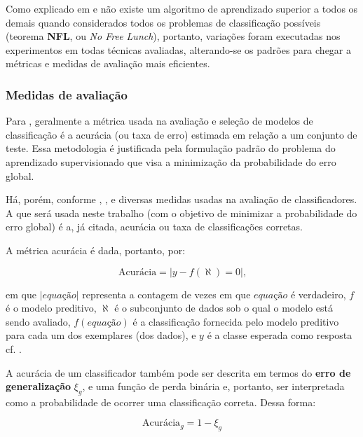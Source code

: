 Como explicado em  e  não existe um algoritmo de aprendizado superior a todos os demais quando considerados todos os problemas de classificação possíveis (teorema \textbf{NFL}, ou \textit{No Free Lunch}), portanto, variações foram executadas nos experimentos em todas técnicas avaliadas, alterando-se os padrões para chegar a métricas e medidas de avaliação mais eficientes.

\subsubsection{Medidas de avaliação}\label{medidas_avaliacao}

Para , geralmente a métrica usada na avaliação e seleção de modelos de classificação é a acurácia (ou taxa de erro) estimada em relação a um conjunto de teste. Essa metodologia é justificada pela formulação padrão do problema do aprendizado supervisionado que visa a minimização da probabilidade do erro global. 

Há, porém, conforme , ,  e  diversas medidas usadas na avaliação de classificadores. A que será usada neste trabalho (com o objetivo de minimizar a probabilidade do erro global) é a, já citada, acurácia ou taxa de classificações corretas. 

A métrica acurácia é dada, portanto, por:

\begin{equation}\label{acuracia}
	\textrm{Acurácia} = |y-f(\aleph)=0|\textrm{,}
\end{equation}

em que $|equação|$ representa a contagem de vezes em que $equação$ é verdadeiro, $f$ é o modelo preditivo, $\aleph$ é o subconjunto de dados sob o qual o modelo está sendo avaliado, $f(equação)$ é a classificação fornecida pelo modelo preditivo para cada um dos exemplares (dos dados), e $y$ é a classe esperada como resposta cf. .

A acurácia de um classificador também pode ser descrita em termos do \textbf{erro de generalização} $\xi_g$, e uma função de perda binária e, portanto, ser interpretada como a probabilidade de ocorrer uma classificação correta. Dessa forma:

\begin{equation}
\textrm{Acurácia}_g=1 - \xi_g
\end{equation}

